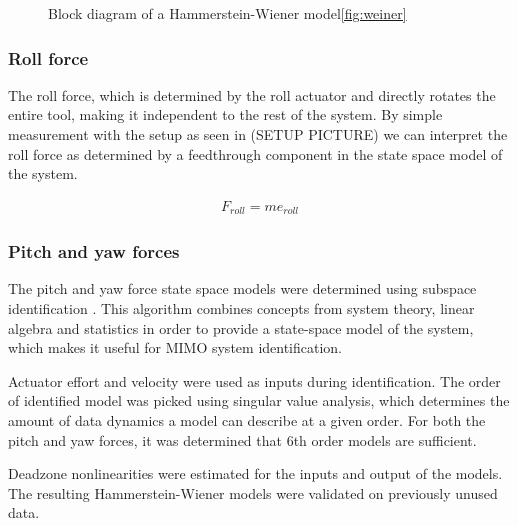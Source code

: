 \begin{figure} 
\caption{Block diagram of a Hammerstein-Wiener model\ref{fig:weiner}}
\label{weiner}
\end{figure}

\subsubsection{Roll force}
The roll force, which is determined by the roll actuator and directly rotates the entire tool, making it independent to the rest of the system.
By simple measurement with the setup as seen in (SETUP PICTURE) we can interpret the roll force as determined by a feedthrough component in the state space model of the system.

\begin{align}
F_{roll} = m e_{roll}
\end{align}

\subsubsection{Pitch and yaw forces}
The pitch and yaw force state space models were determined using subspace identification  \cite{van2012subspace}. This algorithm combines concepts from system theory, linear algebra and statistics in order to provide a state-space model of the system, which makes it useful for MIMO system identification. 

Actuator effort and velocity were used as inputs during identification.
The order of identified model was picked using singular value analysis, which determines the amount of data dynamics a model can describe at a given order. For both the pitch and yaw forces, it was determined that 6th order models are sufficient. 

Deadzone nonlinearities were estimated for the inputs and output of the models. The resulting Hammerstein-Wiener models were validated on previously unused data.




